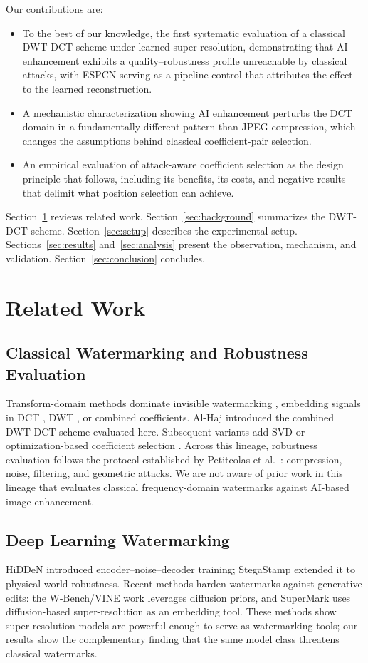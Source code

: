 \documentclass[conference]{IEEEtran}
\begin{document}
Our contributions are:
\begin{itemize}
\item To the best of our knowledge, the first systematic evaluation of
a classical DWT-DCT scheme under learned super-resolution,
demonstrating that AI enhancement exhibits a quality--robustness
profile unreachable by classical attacks, with ESPCN serving as a
pipeline control that attributes the effect to the learned
reconstruction.
\item A mechanistic characterization showing AI enhancement perturbs
the DCT domain in a fundamentally different pattern than JPEG
compression, which changes the assumptions behind classical
coefficient-pair selection.
\item An empirical evaluation of attack-aware coefficient selection as
the design principle that follows, including its benefits, its costs,
and negative results that delimit what position selection can achieve.
\end{itemize}

Section~\ref{sec:related} reviews related work.
Section~\ref{sec:background} summarizes the DWT-DCT scheme.
Section~\ref{sec:setup} describes the experimental setup.
Sections~\ref{sec:results} and~\ref{sec:analysis} present the
observation, mechanism, and validation. Section~\ref{sec:conclusion}
concludes.

\section{Related Work}
\label{sec:related}

\subsection{Classical Watermarking and Robustness Evaluation}
Transform-domain methods dominate invisible watermarking
\cite{cox2007}, embedding signals in DCT \cite{piva1997}, DWT
\cite{barni2001}, or combined coefficients. Al-Haj \cite{alhaj2007}
introduced the combined DWT-DCT scheme evaluated here. Subsequent
variants add SVD \cite{navas2008} or optimization-based coefficient
selection \cite{rijati2025}. Across this lineage, robustness
evaluation follows the protocol established by Petitcolas et
al.~\cite{petitcolas1998}: compression, noise, filtering, and
geometric attacks. We are not aware of prior work in this lineage that
evaluates classical frequency-domain watermarks against AI-based image
enhancement.

\subsection{Deep Learning Watermarking}
HiDDeN \cite{hidden2018} introduced encoder--noise--decoder training;
StegaStamp \cite{stegastamp2020} extended it to physical-world
robustness. Recent methods harden watermarks against generative edits:
the W-Bench/VINE work \cite{wbench2024} leverages diffusion priors,
and SuperMark \cite{supermark2024} uses diffusion-based
super-resolution as an embedding tool. These methods show
super-resolution models are powerful enough to serve as watermarking
tools; our results show the complementary finding that the same model
class threatens classical watermarks.
\end{document}
